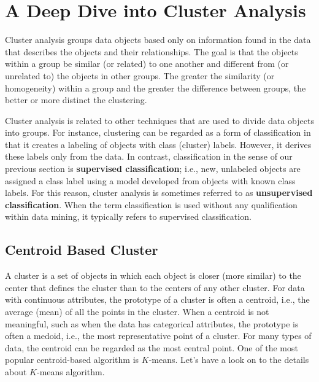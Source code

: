 \section{A Deep Dive into Cluster Analysis}
Cluster analysis groups data objects based only on information found in the
data that describes the objects and their relationships.  The goal is that the
objects within a group be similar (or related) to one another and different from
(or unrelated to) the objects in other groups.  The greater the similarity (or
homogeneity) within a group and the greater the difference between groups,
the better or more distinct the clustering.

Cluster analysis is related to other techniques that are used to divide data
objects into groups.  For instance, clustering can be regarded as a form of
classification in that it creates a labeling of objects with class (cluster) labels.
However, it derives these labels only from the data. In contrast, classification
in the sense of our previous section is \textbf{supervised classification}; i.e.,
new, unlabeled objects are assigned a class label using a model developed from objects with
known class labels. For this reason, cluster analysis is sometimes referred to as
\textbf{unsupervised classification}. When the term classification is used
without any qualification within data mining, it typically refers to supervised
classification.

\subsection{Centroid Based Cluster}
A cluster is a set of objects in which each object is closer
(more similar) to the center that defines the cluster than to the centers
of any other cluster.  For data with continuous attributes, the prototype of a
cluster is often a centroid, i.e., the average (mean) of all the points in the cluster.
When a centroid is not meaningful, such as when the data has categorical
attributes, the prototype is often a medoid, i.e., the most representative point
of a cluster.  For many types of data, the centroid can be regarded as the
most central point. One of the most popular centroid-based algorithm is $K$-means. Let's
have a look on to the details about $K$-means algorithm.

